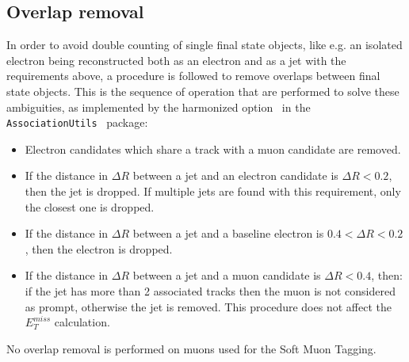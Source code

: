 \subsection{Overlap removal}
\label{sec:object:over_rem}
In order to avoid double counting of single final state objects, like e.g. an 
isolated electron being reconstructed both as an electron and as a jet with the 
requirements above, a procedure is followed to remove overlaps between final state objects. 
This is the sequence of operation that are performed to solve these ambiguities, as 
implemented by the harmonized option~\cite{Adams:1743654} in the \texttt{AssociationUtils}~\cite{AssociationUtils} package:
\begin{itemize}
	\item Electron candidates which share a track with a muon candidate are removed.
	\item If the distance in $\Delta R$ between a jet and an electron candidate 
	is $\Delta R < 0.2$, then the jet is dropped. If multiple jets are found with this requirement, 
	only the closest one is dropped.
	\item If the distance in $\Delta R$ between a jet and a baseline
	electron is $0.4 < \Delta R < 0.2$, 
	then the electron is dropped.
	\item If the distance in $\Delta R$ between a jet and a muon
	candidate is $\Delta R < 0.4$, then: if 
	the jet has more than 2 associated tracks then the muon is not considered as prompt, otherwise the jet is removed. This procedure does not affect the $E^{miss}_{T}$ calculation.
\end{itemize}
No overlap removal is performed on muons used for the Soft Muon Tagging.


\label{soft_mu}


\clearpage
